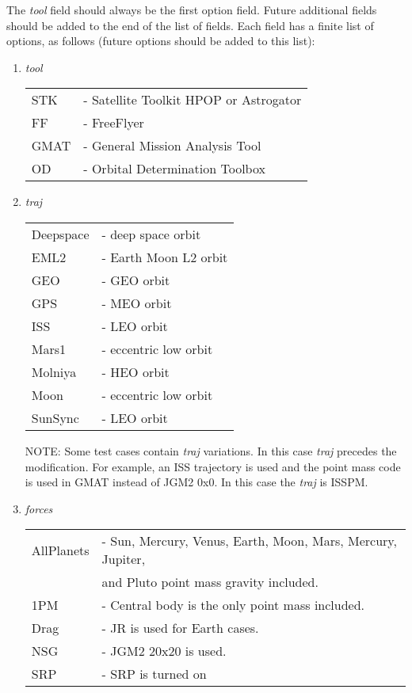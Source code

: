 The \emph{tool} field should always be the first option field.
Future additional fields should be added to the end of the list of
fields. Each field has a finite list of options, as follows (future
options should be added to this list):
\begin{enumerate}
  \item \emph{tool}
  \begin{tabular}{ll}
    STK  & - Satellite Toolkit HPOP or Astrogator\\
    FF   & - FreeFlyer\\
    GMAT & - General Mission Analysis Tool\\
    OD   & - Orbital Determination Toolbox\\
  \end{tabular}

  \item \emph{traj}
  \begin{tabular}{ll}
    Deepspace & - deep space orbit\\
    EML2      & - Earth Moon L2 orbit\\
    GEO       & - GEO orbit\\
    GPS       & - MEO orbit\\
    ISS       & - LEO orbit\\
    Mars1     & - eccentric low orbit\\
    Molniya   & - HEO orbit\\
    Moon      & - eccentric low orbit\\
    SunSync   & - LEO orbit\\
  \end{tabular}

NOTE:  Some test cases contain \emph{traj} variations. In this case
\emph{traj} precedes the modification. For example, an ISS
trajectory is used and the point mass code is used in GMAT instead
of JGM2 0x0. In this case the \emph{traj} is ISSPM.

  \item \emph{forces}
  \begin{tabular}{ll}
    AllPlanets  & - Sun, Mercury, Venus, Earth, Moon, Mars, Mercury, Jupiter,\\
    &   and Pluto point mass gravity included.\\
    1PM         & - Central body is the only point mass included.\\
    Drag        & - JR is used for Earth cases.\\
    NSG         & - JGM2 20x20 is used.\\
    SRP         & - SRP is turned on
  \end{tabular}
\end{enumerate}
